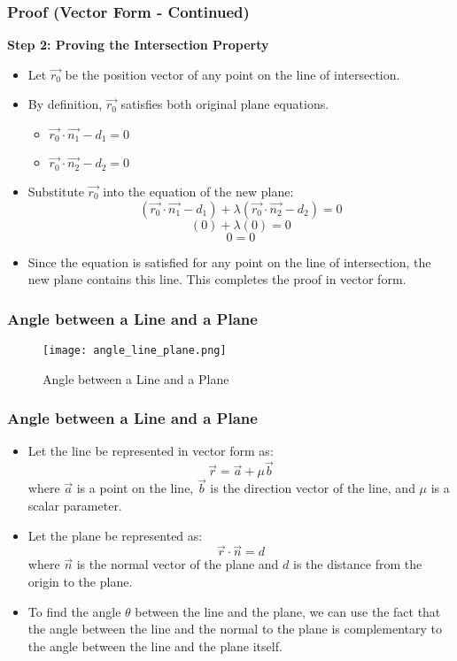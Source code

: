 \begin{frame}
    \frametitle{Proof (Vector Form - Continued)}
    \textbf{Step 2: Proving the Intersection Property}
    \begin{itemize}
        \item Let $\vec{r_0}$ be the position vector of any point on the line of intersection.
        \item By definition, $\vec{r_0}$ satisfies both original plane equations.
        \begin{itemize}
            \item $\vec{r_0} \cdot \vec{n_1} - d_1 = 0$
            \item $\vec{r_0} \cdot \vec{n_2} - d_2 = 0$
        \end{itemize}
        \item Substitute $\vec{r_0}$ into the equation of the new plane:
        \[(\vec{r_0} \cdot \vec{n_1} - d_1) + \lambda(\vec{r_0} \cdot \vec{n_2} - d_2) = 0\]
        \[(0) + \lambda(0) = 0\]
        \[0 = 0\]
        \item Since the equation is satisfied for any point on the line of intersection, the new plane contains this line. This completes the proof in vector form.
    \end{itemize}
\end{frame}

\begin{frame}
    \frametitle{Angle between a Line and a Plane}
    \begin{figure}
        \texttt{[image: angle\_line\_plane.png]}
        \caption{Angle between a Line and a Plane}
    \end{figure}
\end{frame}

\begin{frame}
\frametitle{Angle between a Line and a Plane}
\begin{itemize}
    \item Let the line be represented in vector form as:
    \[\vec{r} = \vec{a} + \mu \vec{b}\]
    where $\vec{a}$ is a point on the line, $\vec{b}$ is the direction vector of the line, and $\mu$ is a scalar parameter.
    \item Let the plane be represented as:
    \[\vec{r} \cdot \vec{n} = d\]
    where $\vec{n}$ is the normal vector of the plane and $d$ is the distance from the origin to the plane.
    \item To find the angle $\theta$ between the line and the plane, we can use the fact that the angle between the line and the normal to the plane is complementary to the angle between the line and the plane itself.
\end{itemize}                       
\end{frame}
